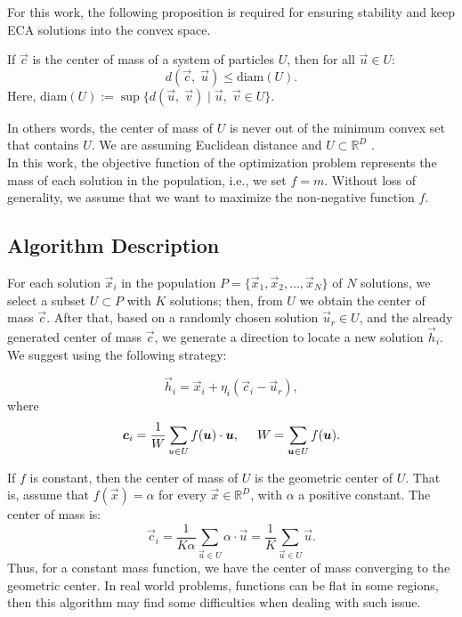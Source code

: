 \documentclass{svproc}
\begin{document}
For this work, the following proposition is required for ensuring stability and keep ECA 
solutions into the convex space.

\begin{proposition}
	If $\vec{c}$ is the center of mass of a system of particles $U$, 
	then  for all $ \vec{u}\in U $:
	$$  d(\vec{c},\; \vec{u} )  \leq \text{diam}(U). $$
	Here, diam$(U) := \sup\{ d(\vec{u},\; \vec{v} ) \; | \; \vec{u} ,\; \vec{v} \in U \}$.
\end{proposition}
%
\noindent
In others words, the center of mass of $U$ is never out of the minimum convex set that 
contains $U$. We are assuming Euclidean distance and $U \subset \mathbb{R}^D$ \cite{rudin}.\\

%
% 
%

In this work, the objective function of the optimization problem represents 
the mass of each solution in the population,  i.e., we set $f = m$. 
Without loss of generality, we assume that we want to maximize 
the non-negative function $f$.




\subsection{Algorithm Description} %
\label{sub:algorithm_description}

For each solution $\vec{x}_i $ in the population $P = \{ \vec{x}_1, \vec{x}_2, \ldots, \vec{x}_{N} \} $ of $N$ 
solutions, we select a subset $U \subset P $ with $K$ solutions; then, 
from $U$ we obtain the center of mass $\vec{c}$. After that, based on 
a randomly chosen solution $\vec{u}_r \in U$,  
and the already generated center of mass $\vec{c}$, we generate a direction 
to locate a new solution $ \vec{h}_i$. We suggest using the following strategy:

\begin{equation}
	\vec{h}_i = \vec{x}_i + \eta _{i} ( \vec{c}_i - \vec{u}_{r} ),
	\label{eqn:vcu}
\end{equation}
%
where 
%
\begin{equation}
	\vec{c}_i = \dfrac{1} {W} \sum_{u \in U} f(\vec{u}) \cdot \vec{u} , 
			\hspace{0.5cm} 
			W = \sum_{ \vec{u} \in U} f(\vec{u}).
	\label{eqn:center}
\end{equation}

\begin{note}
	If $f$ is constant, then the center of mass of $U$ is the geometric 
	center of  $U$. That is, assume that $f(\vec{x}) = \alpha$ for every 
	$\vec{x} \in \mathbb{R}^D$,  with $\alpha$ a positive constant. The 
	center of mass is:
%
\begin{equation}
	\vec{c}_i = \dfrac{1} {K \alpha} \sum_{ \vec{u} \in U} \alpha \cdot \vec{u} %
			  =  \dfrac{1} {K } \sum_{\vec{u} \in U} \vec{u}.
	\label{eqn:center-geometric}
\end{equation}
%
Thus, for a constant mass function, we have the center of mass converging 
to the geometric center. In real world problems, functions can be flat 
in some regions, then this algorithm may find some difficulties  when 
dealing with such issue.
\end{note}
\end{document}
